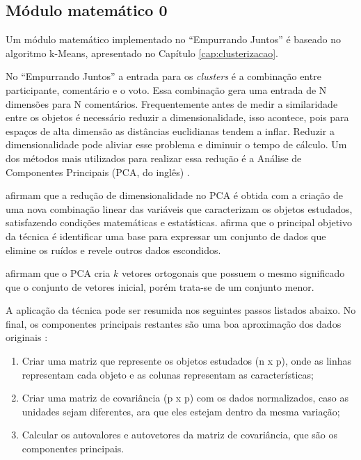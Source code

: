 \begin{apendicesenv}

\partapendices

\chapter{Módulo matemático 0} \label{apd:kmeans}

Um módulo matemático implementado no ``Empurrando Juntos'' é baseado no algoritmo k-Means, apresentado no Capítulo \ref{cap:clusterizacao}. 

No ``Empurrando Juntos'' a entrada para os \textit{clusters} é a combinação entre participante,  
comentário e o voto. Essa combinação gera uma entrada de N dimensões para N comentários.
Frequentemente antes de medir a similaridade entre os objetos é necessário
reduzir a dimensionalidade, isso acontece, pois para espaços de alta dimensão as distâncias euclidianas
tendem a inflar. Reduzir a dimensionalidade pode aliviar esse problema e diminuir o tempo de cálculo.
Um dos métodos mais utilizados para realizar essa redução é a Análise de 
Componentes Principais (PCA, do inglês) \cite{han2011data, sklearn}.

 afirmam que a redução de dimensionalidade no PCA é
obtida com a criação de uma nova combinação linear das variáveis que caracterizam os
objetos estudados, satisfazendo condições matemáticas e estatísticas.
 afirma que o principal objetivo da técnica é identificar
uma base para expressar um conjunto de dados que elimine os ruídos e revele 
outros dados escondidos. 

 afirmam que o PCA 
cria $k$ vetores ortogonais que possuem o mesmo significado que o conjunto
de vetores inicial, porém trata-se de um conjunto menor. 


A aplicação da técnica pode ser resumida nos seguintes passos listados abaixo.
No final, os componentes principais restantes são uma boa aproximação dos 
dados originais \cite{han2011data, mackiewicz1993principal, varella2008analise}: 

\begin{enumerate}
 \item Criar uma matriz que represente os objetos estudados (n x p), onde as linhas representam cada objeto e as colunas representam as características;
 \item Criar uma matriz de covariância (p x p) com os dados normalizados, caso as unidades sejam diferentes,
  ara que eles estejam dentro da mesma variação;
 \item Calcular os autovalores e autovetores da matriz de covariância, que 
 são os componentes principais.
\end{enumerate}


\end{apendicesenv}
